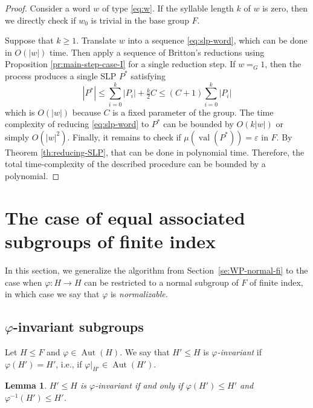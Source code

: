 \documentclass[12pt,oneside]{amsart}
\newtheorem{lemma}[theorem]{Lemma}
\theoremstyle{definition}
\theoremstyle{case}
\DeclareMathOperator{\Aut}{{Aut}}
\DeclareMathOperator{\val}{val}
\begin{document}
\begin{proof}
Consider a word $w$ of type \eqref{eq:w}.
If the syllable length $k$ of $w$ is zero, then 
we directly check if $w_0$ is trivial in the base group $F$.

Suppose that $k\ge 1$.
Translate $w$ into a sequence \eqref{eq:slp-word}, which can be done 
in $O(|w|)$ time.
Then apply a sequence of Britton's reductions 
using Proposition \ref{pr:main-step-case-I} for a single reduction step.
If $w=_G1$, then the process produces a single SLP $P^\ast$
satisfying 
$$
|P^\ast| \le \sum_{i=0}^k |P_i| + \tfrac{k}{2} C
\le
(C+1)\sum_{i=0}^k |P_i|
$$
which is $O(|w|)$ because $C$ is a fixed parameter of the group.
The time complexity of reducing \eqref{eq:slp-word}
to $P^\ast$ can be bounded by $O(k|w|)$
or simply $O(|w|^2)$.
Finally, it remains to check if $\mu(\val(P^\ast)) = \varepsilon$ in $F$.
By Theorem \ref{th:reducing-SLP}, that can be done in polynomial time.
Therefore, the total time-complexity of the described procedure 
can be bounded by a polynomial.
\end{proof}


\section{The case of equal associated subgroups of finite index}
\label{se:normalizable}

In this section, we generalize the algorithm from Section~\ref{se:WP-normal-fi} 
to the case when $\varphi:H\to H$ can be restricted to a normal subgroup 
of $F$ of finite index, in which case we say that $\varphi$ is \emph{normalizable}.

\subsection{$\varphi$-invariant subgroups}

Let $H\le F$ and $\varphi \in\Aut(H)$.
We say that $H'\le H$ is \emph{$\varphi$-invariant} if 
$\varphi(H')= H'$, i.e., if $\varphi|_{H'} \in \Aut(H')$.

\begin{lemma}\label{le:phi_image}
$H'\le H$ is \emph{$\varphi$-invariant} if and only if 
$\varphi(H')\le H'$ and $\varphi^{-1}(H')\le H'$.
\end{lemma}
\end{document}
